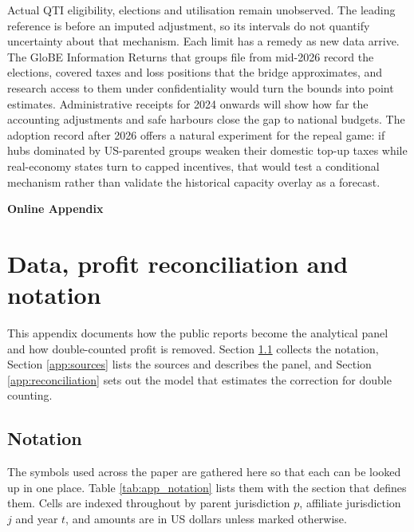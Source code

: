 \documentclass[11pt,a4paper]{article}
\begin{document}
Actual QTI eligibility, elections and utilisation remain unobserved. The leading reference is before an imputed adjustment, so its intervals do not quantify uncertainty about that mechanism. Each limit has a remedy as new data arrive. The GloBE Information Returns that groups file from mid-2026 record the elections, covered taxes and loss positions that the bridge approximates, and research access to them under confidentiality would turn the bounds into point estimates. Administrative receipts for 2024 onwards will show how far the accounting adjustments and safe harbours close the gap to national budgets. The adoption record after 2026 offers a natural experiment for the repeal game: if hubs dominated by US-parented groups weaken their domestic top-up taxes while real-economy states turn to capped incentives, that would test a conditional mechanism rather than validate the historical capacity overlay as a forecast.




\clearpage
\appendix
{}
\begin{center}
{\Large\bfseries Online Appendix}
\end{center}

\section{Data, profit reconciliation and notation}\label{app:data}

This appendix documents how the public reports become the analytical panel and how double-counted profit is removed. Section \ref{app:notation} collects the notation, Section \ref{app:sources} lists the sources and describes the panel, and Section \ref{app:reconciliation} sets out the model that estimates the correction for double counting.

\subsection{Notation}\label{app:notation}

The symbols used across the paper are gathered here so that each can be looked up in one place. Table \ref{tab:app_notation} lists them with the section that defines them. Cells are indexed throughout by parent jurisdiction $p$, affiliate jurisdiction $j$ and year $t$, and amounts are in US dollars unless marked otherwise.
\end{document}
